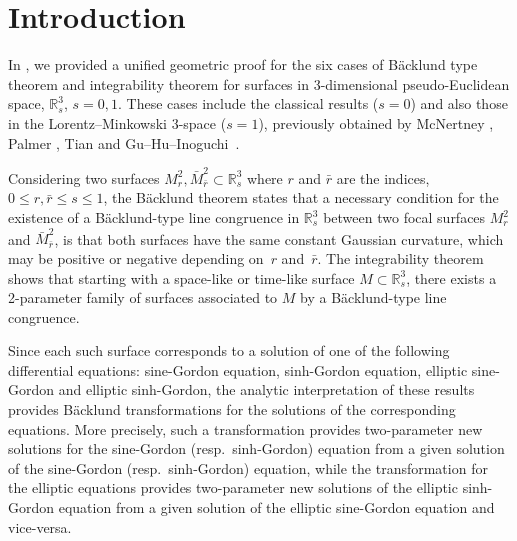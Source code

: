 \documentclass[pdftex]{sigma}
\numberwithin{equation}{section}
\begin{document}

\section{Introduction}
In \cite{KRT2022}, we provided a unified geometric proof
for the six cases of B\"acklund type theorem and integrability
theorem for surfaces in 3-dimensional pseudo-Euclidean space, ${\mathbb{R}}^3_s$, $s=0,1$. These cases include the classical results ($s=0$) and
also those in the Lorentz--Minkowski 3-space ($s=1$), previously obtained by McNertney \cite{McNertney1980}, Palmer \cite{Palmer1990}, Tian \cite{Tian1997} and Gu--Hu--Inoguchi~\cite{Gu--Hu--Inoguchi2002}.

Considering two surfaces $M^2_r,\bar{M}^2_{\bar{r}}\subset{\mathbb{R}}^3_s$ where $r$ and $\bar{r}$ are the indices, $0\leq r,\bar{r}\leq s\leq 1$, the B\"acklund theorem states that a necessary condition for the existence of a B\"acklund-type line congruence in ${\mathbb{R}}^3_s$ between two focal surfaces $M^2_r$ and $\bar{M}^2_{\bar{r}}$, is that both surfaces have the same constant Gaussian curvature, which may be positive or negative depending on~$r$ and~$\bar{r}$. The integrability theorem shows that starting with a space-like or time-like surface ${M\subset \mathbb{R}^3_s}$, there exists a 2-parameter family of surfaces associated to $M$ by a B\"acklund-type line con\-gruence.

Since each such surface corresponds to a solution of one of the following differential equations: sine-Gordon equation, sinh-Gordon equation, elliptic sine-Gordon and elliptic sinh-Gordon, the analytic interpretation of these results provides B\"acklund transformations for the solutions of the corresponding equations. More precisely, such a transformation provides two-parameter new solutions for the sine-Gordon (resp.\ sinh-Gordon) equation from a given solution of the sine-Gordon (resp.\ sinh-Gordon) equation, while the transformation for the elliptic equations provides two-parameter new solutions of the elliptic sinh-Gordon equation from a given solution of the elliptic sine-Gordon equation and vice-versa.
\end{document}
